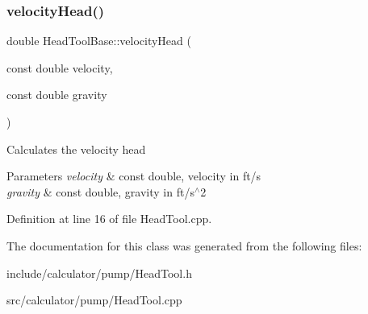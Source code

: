 \subsubsection{\texorpdfstring{velocity\+Head()}{velocityHead()}}
{\footnotesize\ttfamily double Head\+Tool\+Base\+::velocity\+Head (\begin{DoxyParamCaption}\item[{const double}]{velocity,  }\item[{const double}]{gravity }\end{DoxyParamCaption})\hspace{0.3cm}{\ttfamily [protected]}}

Calculates the velocity head


\begin{DoxyParams}{Parameters}
{\em velocity} & const double, velocity in ft/s \\
\hline
{\em gravity} & const double, gravity in ft/s$^\wedge$2 \\
\hline
\end{DoxyParams}


Definition at line 16 of file Head\+Tool.\+cpp.



The documentation for this class was generated from the following files\+:\begin{DoxyCompactItemize}
\item 
include/calculator/pump/Head\+Tool.\+h\item 
src/calculator/pump/Head\+Tool.\+cpp\end{DoxyCompactItemize}
